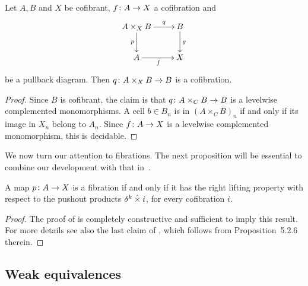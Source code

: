 \documentclass[reqno,10pt,a4paper,oneside,draft]{amsart}
\begin{document}
\begin{proposition} \label{thm:cof-pbk} Let $A ,B$ and $X$ be cofibrant, $f \colon A \rightarrow X$ a cofibration and
\[
\xymatrix{
A \times_X B \ar[r]^-{q} \ar[d]_-{p} &  B \ar[d]^g \\
A \ar[r]_f & X}
\]
be a pullback diagram. Then $q \colon A \times_X B \rightarrow B$ is a cofibration.
\end{proposition}

\begin{proof} Since $B$ is cofibrant, the claim is that $q \colon A \times_C B \rightarrow B$ is a levelwise complemented monomorphisms. A cell $b \in B_n$ is in  $(A \times_C B)_n$ if and only if its image in $X_n$ belong to $A_n$. Since $f \colon A \rightarrow X$ is a levelwise complemented monomorphism, this is decidable.
\end{proof} 




\bigskip

We now turn our attention to fibrations. The next proposition will be essential to combine our development with that in~\cite{gambino2017frobenius}.




\begin{proposition} A map $p \colon A \to X$ is a fibration if and only if it has the right lifting property with respect to the pushout products $ \delta^k  \mathbin{\hat{\times}} i$, for every cofibration $i$.
\end{proposition} 

\begin{proof}The proof of \cite[Theorem~3.2.3]{joyal-tierney:simplicial-homotopy-theory} is completely constructive and sufficient to imply this result.
For more details see also the last claim of \cite[Corollary~5.3.2]{henry2018wms}, which follows from Proposition~5.2.6 therein. 
\end{proof}

\subsection*{Weak equivalences} 
\end{document}
